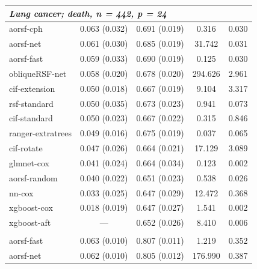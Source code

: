 \documentclass{article}\usepackage[]{graphicx}\usepackage[]{xcolor}
\newenvironment{knitrout}{}{} %
\begin{document}
\begin{knitrout}
\begin{longtable}[t]{lcccc}
\multicolumn{5}{l}{\textit{\textbf{Lung cancer; death, n = 442, p = 24}}}\\
\hline
\hspace{1em}aorsf-cph & 0.063 (0.032) & 0.691 (0.019) & 0.316 & 0.030\\
\hspace{1em}aorsf-net & 0.061 (0.030) & 0.685 (0.019) & 31.742 & 0.031\\
\hspace{1em}aorsf-fast & 0.059 (0.033) & 0.690 (0.019) & 0.125 & 0.030\\
\hspace{1em}obliqueRSF-net & 0.058 (0.020) & 0.678 (0.020) & 294.626 & 2.961\\
\hspace{1em}cif-extension & 0.050 (0.018) & 0.667 (0.019) & 9.104 & 3.317\\
\hspace{1em}rsf-standard & 0.050 (0.035) & 0.673 (0.023) & 0.941 & 0.073\\
\hspace{1em}cif-standard & 0.050 (0.023) & 0.667 (0.022) & 0.315 & 0.846\\
\hspace{1em}ranger-extratrees & 0.049 (0.016) & 0.675 (0.019) & 0.037 & 0.065\\
\hspace{1em}cif-rotate & 0.047 (0.026) & 0.664 (0.021) & 17.129 & 3.089\\
\hspace{1em}glmnet-cox & 0.041 (0.024) & 0.664 (0.034) & 0.123 & 0.002\\
\hspace{1em}aorsf-random & 0.040 (0.022) & 0.651 (0.023) & 0.538 & 0.026\\
\hspace{1em}nn-cox & 0.033 (0.025) & 0.647 (0.029) & 12.472 & 0.368\\
\hspace{1em}xgboost-cox & 0.018 (0.019) & 0.647 (0.027) & 1.541 & 0.002\\
\hspace{1em}xgboost-aft & --- & 0.652 (0.026) & 8.410 & 0.006\\
\addlinespace[0.3em]
\multicolumn{5}{l}{\textit{\textbf{MESA; coronary heart disease, n = 6785, p = 48}}}\\
\hline
\hspace{1em}aorsf-fast & 0.063 (0.010) & 0.807 (0.011) & 1.219 & 0.352\\
\hspace{1em}aorsf-net & 0.062 (0.010) & 0.805 (0.012) & 176.990 & 0.387\\

\end{longtable}
\end{knitrout}
\end{document}
